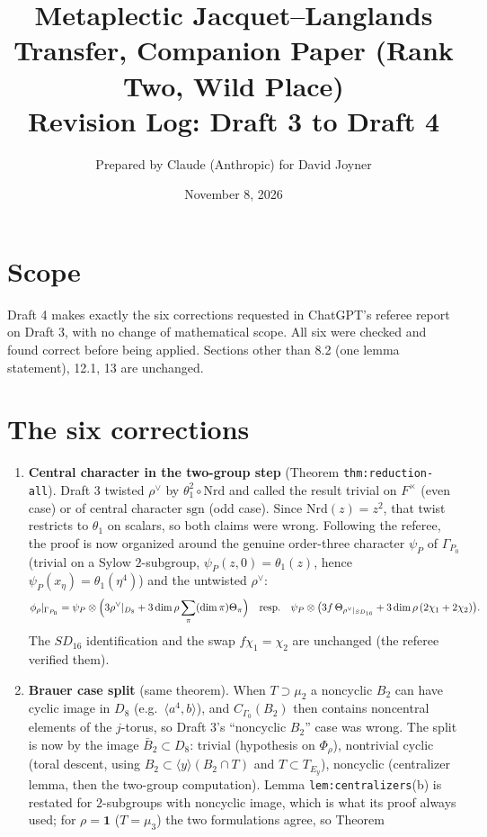\documentclass[11pt]{article}
\title{Metaplectic Jacquet--Langlands Transfer, Companion Paper (Rank Two, Wild Place)\\Revision Log: Draft 3 to Draft 4}
\author{Prepared by Claude (Anthropic) for David Joyner}
\date{November 8, 2026}
\begin{document}
\maketitle
\section*{Scope}
Draft 4 makes exactly the six corrections requested in ChatGPT's referee
report on Draft 3, with no change of mathematical scope.  All six were
checked and found correct before being applied.  Sections other than
8.2 (one lemma statement), 12.1, 13 are unchanged.
\section*{The six corrections}
\begin{enumerate}[leftmargin=*]
\item \textbf{Central character in the two-group step} (Theorem
\texttt{thm:reduction-all}).  Draft 3 twisted $\rho^\vee$ by
$\theta_1^2\circ\mathrm{Nrd}$ and called the result trivial on $F^\times$
(even case) or of central character $\mathrm{sgn}$ (odd case).  Since
$\mathrm{Nrd}(z)=z^2$, that twist restricts to $\theta_1$ on scalars, so
both claims were wrong.  Following the referee, the proof is now
organized around the genuine order-three character $\psi_P$ of
$\Gamma_{P_0}$ (trivial on a Sylow $2$-subgroup, $\psi_P(z,0)=\theta_1(z)$,
hence $\psi_P(x_\eta)=\theta_1(\eta^4)$) and the untwisted $\rho^\vee$:
\[
 \phi_\rho|_{\Gamma_{P_0}}=\psi_P\otimes\Bigl(3\rho^\vee|_{D_8}+3\dim\rho\sum_{\pi}(\dim\pi)\Theta_\pi\Bigr)
 \quad\text{resp.}\quad
 \psi_P\otimes\bigl(3f\,\Theta_{\rho^\vee|_{SD_{16}}}+3\dim\rho\,(2\chi_1+2\chi_2)\bigr).
\]
The $SD_{16}$ identification and the swap $f\chi_1=\chi_2$ are unchanged
(the referee verified them).
\item \textbf{Brauer case split} (same theorem).  When $T\supset\mu_2$ a
noncyclic $B_2$ can have cyclic image in $D_8$ (e.g.\ $\langle a^4,b\rangle$),
and $C_{\Gamma_0}(B_2)$ then contains noncentral elements of the
$j$-torus, so Draft 3's ``noncyclic $B_2$'' case was wrong.  The split
is now by the image $\bar B_2\subset D_8$: trivial (hypothesis on
$\Phi_\rho$), nontrivial cyclic (toral descent, using
$B_2\subset\langle y\rangle(B_2\cap T)$ and $T\subset T_{E_y}$), noncyclic
(centralizer lemma, then the two-group computation).  Lemma
\texttt{lem:centralizers}(b) is restated for $2$-subgroups with
noncyclic image, which is what its proof always used; for $\rho=\mathbf 1$
($T=\mu_3$) the two formulations agree, so Theorem

\end{enumerate}
\end{document}
